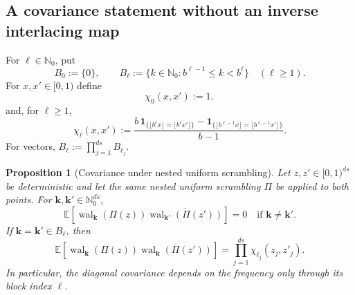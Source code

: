 \documentclass[11pt]{article}
\newtheorem{proposition}[theorem]{Proposition}
\newcommand{\Nzero}{\mathbb N_0}
\newcommand{\wal}{\operatorname{wal}}
\newcommand{\one}{\mathbf 1}
\newcommand{\set}[1]{\{#1\}}
\newcommand{\floor}[1]{\lfloor #1\rfloor}
\begin{document}
\subsection{A covariance statement without an inverse interlacing map}

For $\ell\in\Nzero$, put
\[
 B_0:=\set{0},\qquad
 B_\ell:=\set{k\in\Nzero:b^{\ell-1}\le k<b^\ell}\quad(\ell\ge1).
\]
For $x,x'\in[0,1)$ define
\[
 \chi_0(x,x'):=1,
\]
and, for $\ell\ge1$,
\begin{equation}\label{eq:chi}
 \chi_\ell(x,x')
 :=\frac{b\,\one_{\{\floor{b^\ell x}=\floor{b^\ell x'}\}}
       -\one_{\{\floor{b^{\ell-1}x}=\floor{b^{\ell-1}x'}\}}}{b-1}.
\end{equation}
For vectors, $B_{\boldsymbol\ell}:=\prod_{j=1}^{ds}B_{\ell_j}$.

\begin{proposition}[Covariance under nested uniform scrambling]\label{prop:covariance}
Let $z,z'\in[0,1)^{ds}$ be deterministic and let the same nested uniform
scrambling $\Pi$ be applied to both points.  For
$\boldsymbol k,\boldsymbol k'\in\Nzero^{ds}$,
\[
 \mathbb E\!\left[
 \wal_{\boldsymbol k}(\Pi(z))
 \overline{\wal_{\boldsymbol k'}(\Pi(z'))}
 \right]=0
 \quad\text{if }\boldsymbol k\ne\boldsymbol k'.
\]
If $\boldsymbol k=\boldsymbol k'\in B_{\boldsymbol\ell}$, then
\begin{equation}\label{eq:block-covariance}
 \mathbb E\!\left[
 \wal_{\boldsymbol k}(\Pi(z))
 \overline{\wal_{\boldsymbol k}(\Pi(z'))}
 \right]
 =\prod_{j=1}^{ds}\chi_{\ell_j}(z_j,z'_j).
\end{equation}
In particular, the diagonal covariance depends on the frequency only through
its block index $\boldsymbol\ell$.
\end{proposition}
\end{document}
